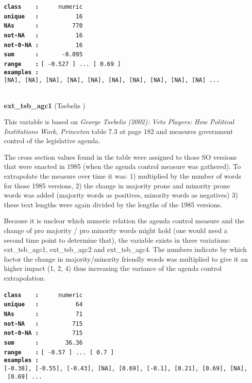 \documentclass[]{article}
\begin{document}
\textbf{\texttt{class\ \ \ \ :}} \texttt{~~~~~numeric}\\
\textbf{\texttt{unique\ \ \ :}} \texttt{~~~~~~~~~~16}\\
\textbf{\texttt{NAs\ \ \ \ \ \ :}} \texttt{~~~~~~~~~770}\\
\textbf{\texttt{not-NA\ \ \ :}} \texttt{~~~~~~~~~~16}\\
\textbf{\texttt{not-0-NA\ :}} \texttt{~~~~~~~~~~16}\\
\textbf{\texttt{sum\ \ \ \ \ \ :}} \texttt{~~~~~~-0.095}\\
\textbf{\texttt{range\ \ \ \ :}}
\texttt{{[}\ -0.527\ {]}\ ...\ {[}\ 0.69\ {]}}\\
\textbf{\texttt{examples\ :}}
\texttt{{[}NA{]},\ {[}NA{]},\ {[}NA{]},\ {[}NA{]},\ {[}NA{]},\ {[}NA{]},\ {[}NA{]},\ {[}NA{]},\ {[}NA{]},\ {[}NA{]}\ ...}\\

~

\textbf{ext\_tsb\_agc1} (Tsebelis )

This variable is based on \emph{George Tsebelis (2002): Veto Players:
How Political Institutions Work, Princeton} table 7.3 at page 182 and
measures government control of the legislative agenda.

The cross section values found in the table were assigned to those SO
versions that were enacted in 1985 (when the agenda control measure was
gathered). To extrapolate the measure over time it was: 1) multiplied by
the number of words for those 1985 versions, 2) the change in majority
prone and minority prone words was added (majority words as positives,
minority words as negatives) 3) these text lengths were again divided by
the lengths of the 1985 versions.

Because it is unclear which numeric relation the agenda control measure
and the change of pro majority / pro minority words might hold (one
would need a second time point to determine that), the variable exists
in three variations: ext\_tsb\_agc1, ext\_tsb\_agc2 and ext\_tsb\_agc4.
The numbers indicate by which factor the change in majority/minority
friendly words was multiplied to give it an higher impact (1, 2, 4) thus
increasing the variance of the agenda control extrapolation.

\textbf{\texttt{class\ \ \ \ :}} \texttt{~~~~~numeric}\\
\textbf{\texttt{unique\ \ \ :}} \texttt{~~~~~~~~~~64}\\
\textbf{\texttt{NAs\ \ \ \ \ \ :}} \texttt{~~~~~~~~~~71}\\
\textbf{\texttt{not-NA\ \ \ :}} \texttt{~~~~~~~~~715}\\
\textbf{\texttt{not-0-NA\ :}} \texttt{~~~~~~~~~715}\\
\textbf{\texttt{sum\ \ \ \ \ \ :}} \texttt{~~~~~~~36.36}\\
\textbf{\texttt{range\ \ \ \ :}}
\texttt{{[}\ -0.57\ {]}\ ...\ {[}\ 0.7\ {]}}\\
\textbf{\texttt{examples\ :}}
\texttt{{[}-0.38{]},\ {[}-0.55{]},\ {[}-0.43{]},\ {[}NA{]},\ {[}0.69{]},\ {[}-0.1{]},\ {[}0.21{]},\ {[}0.69{]},\ {[}NA{]},\ {[}0.69{]}\ ...}\\
\end{document}
